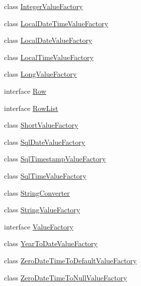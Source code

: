 \begin{DoxyCompactItemize}
\item 
class \mbox{\hyperlink{classcom_1_1mysql_1_1cj_1_1result_1_1_integer_value_factory}{Integer\+Value\+Factory}}
\item 
class \mbox{\hyperlink{classcom_1_1mysql_1_1cj_1_1result_1_1_local_date_time_value_factory}{Local\+Date\+Time\+Value\+Factory}}
\item 
class \mbox{\hyperlink{classcom_1_1mysql_1_1cj_1_1result_1_1_local_date_value_factory}{Local\+Date\+Value\+Factory}}
\item 
class \mbox{\hyperlink{classcom_1_1mysql_1_1cj_1_1result_1_1_local_time_value_factory}{Local\+Time\+Value\+Factory}}
\item 
class \mbox{\hyperlink{classcom_1_1mysql_1_1cj_1_1result_1_1_long_value_factory}{Long\+Value\+Factory}}
\item 
interface \mbox{\hyperlink{interfacecom_1_1mysql_1_1cj_1_1result_1_1_row}{Row}}
\item 
interface \mbox{\hyperlink{interfacecom_1_1mysql_1_1cj_1_1result_1_1_row_list}{Row\+List}}
\item 
class \mbox{\hyperlink{classcom_1_1mysql_1_1cj_1_1result_1_1_short_value_factory}{Short\+Value\+Factory}}
\item 
class \mbox{\hyperlink{classcom_1_1mysql_1_1cj_1_1result_1_1_sql_date_value_factory}{Sql\+Date\+Value\+Factory}}
\item 
class \mbox{\hyperlink{classcom_1_1mysql_1_1cj_1_1result_1_1_sql_timestamp_value_factory}{Sql\+Timestamp\+Value\+Factory}}
\item 
class \mbox{\hyperlink{classcom_1_1mysql_1_1cj_1_1result_1_1_sql_time_value_factory}{Sql\+Time\+Value\+Factory}}
\item 
class \mbox{\hyperlink{classcom_1_1mysql_1_1cj_1_1result_1_1_string_converter}{String\+Converter}}
\item 
class \mbox{\hyperlink{classcom_1_1mysql_1_1cj_1_1result_1_1_string_value_factory}{String\+Value\+Factory}}
\item 
interface \mbox{\hyperlink{interfacecom_1_1mysql_1_1cj_1_1result_1_1_value_factory}{Value\+Factory}}
\item 
class \mbox{\hyperlink{classcom_1_1mysql_1_1cj_1_1result_1_1_year_to_date_value_factory}{Year\+To\+Date\+Value\+Factory}}
\item 
class \mbox{\hyperlink{classcom_1_1mysql_1_1cj_1_1result_1_1_zero_date_time_to_default_value_factory}{Zero\+Date\+Time\+To\+Default\+Value\+Factory}}
\item 
class \mbox{\hyperlink{classcom_1_1mysql_1_1cj_1_1result_1_1_zero_date_time_to_null_value_factory}{Zero\+Date\+Time\+To\+Null\+Value\+Factory}}
\end{DoxyCompactItemize}

